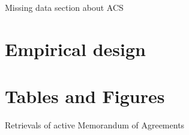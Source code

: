 \documentclass{article}
\begin{document}
Missing data section about ACS

\section{Empirical design}

\begin{comment}

in migration: previous year is different from the current year
\begin{equation}
    in-migration_{icy} = \beta_{0} + \beta_{1}exposure_{cy}*targeted_{i} +  \beta_{2}exposure_{cy} + \beta_{3}targeted_{i} + \beta_{42}W_{y} + \beta_{53}Z_{c} + \epsilon_{cy} 
\end{equation}

out migration 
\begin{equation}
    out-migration_{ic'y'} = \beta'_{0} + \beta'_{1}exposure_{c'y'}*targeted_{i} + \beta'_{2}exposure_{c'y'} + \beta'_{3}targeted_{i} + \beta'_{42}W_{y'} + \beta'_{43}Z_{c'} + \epsilon_{c'y'} 
\end{equation}
\end{comment}

\newpage



\section{Tables and Figures}

\begin{table}[h]
\centering
\caption{Retrievals of active Memorandum of Agreements}
\label{tab:retrievals}
\end{table}
\end{document}
